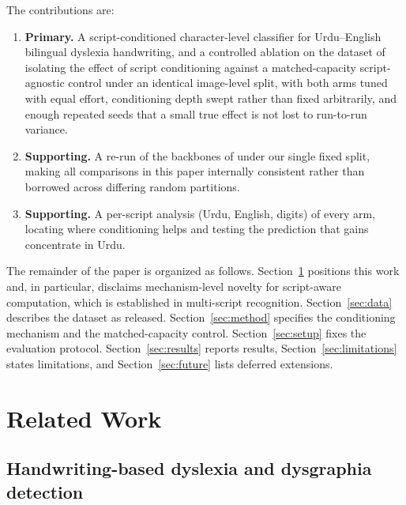 \documentclass[11pt,a4paper]{article}
\begin{document}
The contributions are:
\begin{enumerate}
  \item \textbf{Primary.} A script-conditioned character-level
  classifier for Urdu--English bilingual dyslexia handwriting, and a
  controlled ablation on the dataset of \citet{kashif2026} isolating
  the effect of script conditioning against a matched-capacity
  script-agnostic control under an identical image-level split, with
  both arms tuned with equal effort, conditioning depth swept rather
  than fixed arbitrarily, and enough repeated seeds that a small true
  effect is not lost to run-to-run variance.
  \item \textbf{Supporting.} A re-run of the backbones of
  \citet{kashif2026} under our single fixed split, making all
  comparisons in this paper internally consistent rather than
  borrowed across differing random partitions.
  \item \textbf{Supporting.} A per-script analysis (Urdu, English,
  digits) of every arm, locating where conditioning helps and testing
  the prediction that gains concentrate in Urdu.
\end{enumerate}

The remainder of the paper is organized as follows.
Section~\ref{sec:related} positions this work and, in particular,
disclaims mechanism-level novelty for script-aware computation, which
is established in multi-script recognition. Section~\ref{sec:data}
describes the dataset as released. Section~\ref{sec:method} specifies
the conditioning mechanism and the matched-capacity control.
Section~\ref{sec:setup} fixes the evaluation protocol.
Section~\ref{sec:results} reports results,
Section~\ref{sec:limitations} states limitations, and
Section~\ref{sec:future} lists deferred extensions.

\section{Related Work}
\label{sec:related}

\subsection{Handwriting-based dyslexia and dysgraphia detection}
\end{document}
